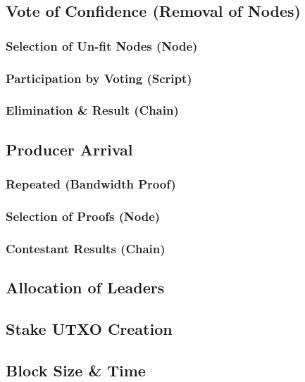 \documentclass[a4paper,11pt]{article}
\begin{document}
\subsection{Vote of Confidence (Removal of Nodes)}

\subsubsection{Selection of Un-fit Nodes (Node)}

\subsubsection{Participation by Voting (Script)}

\subsubsection{Elimination \& Result (Chain)}

\subsection{Producer Arrival}

\subsubsection{Repeated (Bandwidth Proof)}

\subsubsection{Selection of Proofs (Node)}

\subsubsection{Contestant Results (Chain)}

\subsection{Allocation of Leaders}

\subsection{Stake UTXO Creation}

\subsection{Block Size \& Time}
\end{document}
